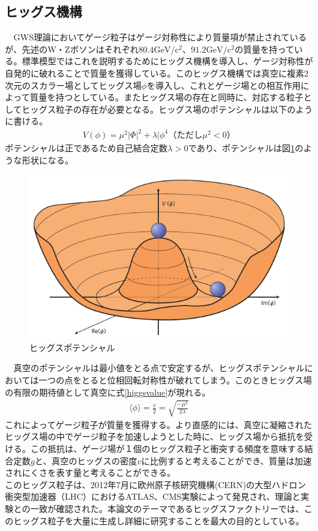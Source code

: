 \subsection{ヒッグス機構}
　GWS理論においてゲージ粒子はゲージ対称性により質量項が禁止されているが、先述のW・Zボソンはそれぞれ$80.4\mathrm{GeV/c^2}$、$91.2\mathrm{GeV/c^2}$の質量を持っている。標準模型ではこれを説明するためにヒッグス機構を導入し、ゲージ対称性が自発的に破れることで質量を獲得している。このヒッグス機構では真空に複素2次元のスカラー場としてヒッグス場$\phi$を導入し、これとゲージ場との相互作用によって質量を持つとしている。またヒッグス場の存在と同時に、対応する粒子としてヒッグス粒子の存在が必要となる。ヒッグス場のポテンシャルは以下のように書ける。
\begin{align}
V(\phi) = {\mu}^2{|\Phi|}^2 + \lambda {|\phi}^4　（ただし{\mu}^2 < 0）
\end{align}
ポテンシャルは正であるため自己結合定数$\lambda > 0$であり、ポテンシャルは図\ref{higgspotential}のような形状になる。\\
\begin{figure}[h]
	\begin{center}
 \includegraphics[keepaspectratio, scale=0.3]
 	{Figure/Introduction/higgspotential.png}
 		\caption{ヒッグスポテンシャル}
 		\label{higgspotential}
	\end{center}
\end{figure}
　真空のポテンシャルは最小値をとる点で安定するが、ヒッグスポテンシャルにおいては一つの点をとると位相回転対称性が破れてしまう。このときヒッグス場の有限の期待値として真空に式\ref{higgsvalue}が現れる。\\
\begin{align}
\label{higgsvalue}
\langle \phi \rangle = \frac{v}{2} = \sqrt{\frac{-{\mu}^2}{2\lambda}}
\end{align}
これによってゲージ粒子が質量を獲得する。より直感的には、真空に凝縮されたヒッグス場の中でゲージ粒子を加速しようとした時に、ヒッグス場から抵抗を受ける。この抵抗は、ゲージ場が１個のヒッグス粒子と衝突する頻度を意味する結合定数$g$と、真空のヒッグスの密度$v$に比例すると考えることができ、質量は加速されにくさを表す量と考えることができる。\\
このヒッグス粒子は、2012年7月に欧州原子核研究機構(CERN)の大型ハドロン衝突型加速器（LHC）におけるATLAS、CMS実験によって発見され、理論と実験との一致が確認された。本論文のテーマであるヒッグスファクトリーでは、このヒッグス粒子を大量に生成し詳細に研究することを最大の目的としている。\\

